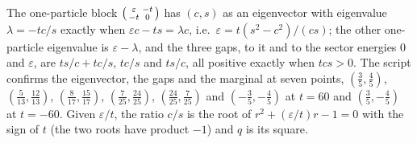 The one-particle block $\begin{psmallmatrix} \varepsilon & -t \\ -t & 0\end{psmallmatrix}$ has $(c, s)$ as an eigenvector with eigenvalue $\lambda = -tc/s$ exactly when $\varepsilon c - ts = \lambda c$, i.e.\ $\varepsilon = t(s^{2} - c^{2})/(cs)$; the other one-particle eigenvalue is $\varepsilon - \lambda$, and the three gaps, to it and to the sector energies $0$ and $\varepsilon$, are $ts/c + tc/s$, $tc/s$ and $ts/c$, all positive exactly when $tcs > 0$. The script confirms the eigenvector, the gaps and the marginal at seven points, $(\tfrac35, \tfrac45)$, $(\tfrac{5}{13}, \tfrac{12}{13})$, $(\tfrac{8}{17}, \tfrac{15}{17})$, $(\tfrac{7}{25}, \tfrac{24}{25})$, $(\tfrac{24}{25}, \tfrac{7}{25})$ and $(-\tfrac35, -\tfrac45)$ at $t = 60$ and $(\tfrac35, -\tfrac45)$ at $t = -60$. Given $\varepsilon/t$, the ratio $c/s$ is the root of $r^{2} + (\varepsilon/t)r - 1 = 0$ with the sign of $t$ (the two roots have product $-1$) and $q$ is its square.
